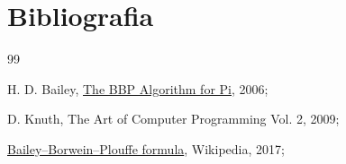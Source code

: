 \newpage
\section{Bibliografia}

\begingroup
\renewcommand{\section}[2]{}
\begin{thebibliography} {99}

    H. D. Bailey,
    \href{http://www.davidhbailey.com/dhbpapers/bbp-alg.pdf}{The BBP Algorithm for Pi},
    2006;
    
    D. Knuth,
    The Art of Computer Programming Vol. 2,
    2009;
  
    \href{https://en.wikipedia.org/wiki/Bailey%E2%80%93Borwein%E2%80%93Plouffe_formula}{Bailey–Borwein–Plouffe formula},
    Wikipedia,
    2017;
    
\end{thebibliography}
\endgroup